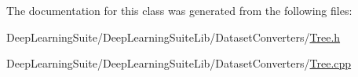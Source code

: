 The documentation for this class was generated from the following files\+:\begin{DoxyCompactItemize}
\item 
Deep\+Learning\+Suite/\+Deep\+Learning\+Suite\+Lib/\+Dataset\+Converters/\hyperlink{_tree_8h}{Tree.\+h}\item 
Deep\+Learning\+Suite/\+Deep\+Learning\+Suite\+Lib/\+Dataset\+Converters/\hyperlink{_tree_8cpp}{Tree.\+cpp}\end{DoxyCompactItemize}
